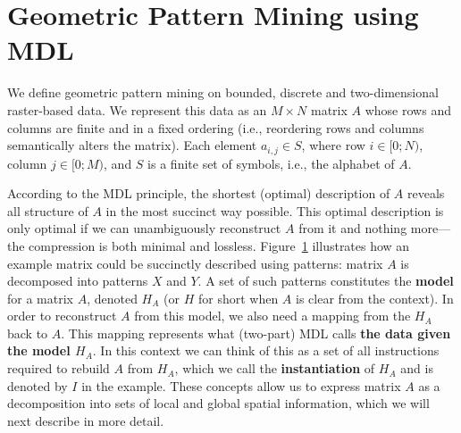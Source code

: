 \documentclass{llncs}
\begin{document}
\section{Geometric Pattern Mining using MDL}



We define geometric pattern mining on bounded, discrete and two-dimensional raster-based data. We represent this data as an $M\times N$ matrix $A$ whose rows and columns are finite and in a fixed ordering (i.e., reordering rows and columns semantically alters the matrix). Each element $a_{i,j} \in S$, where row $i \in [0;N)$, column $j \in [0;M)$, and $S$ is a finite set of symbols, i.e., the alphabet of $A$. %

\begin{figure}[b]

\label{example1}
\end{figure}

According to the MDL principle, the shortest (optimal) description of $A$ reveals all structure of $A$ in the most succinct way possible. This optimal description is only optimal if we can unambiguously reconstruct $A$ from it and nothing more---the compression is both minimal and lossless. Figure~\ref{example1} illustrates how an example matrix could be succinctly described using patterns: matrix $A$ is decomposed into patterns $X$ and $Y$. A set of such patterns constitutes the \textbf{model} for a matrix $A$, denoted $H_A$ (or $H$ for short when $A$ is clear from the context). In order to reconstruct $A$ from this model, we also need a mapping from the $H_A$ back to $A$. This mapping represents what (two-part) MDL calls \textbf{the data given the model $H_A$}. In this context we can think of this as a set of all instructions required to rebuild $A$ from $H_A$, which we call the \textbf{instantiation} of $H_A$ and is denoted by ${I}$ in the example. These concepts allow us to express matrix $A$ as a decomposition into sets of local and global spatial information, which we will next describe in more detail.
\end{document}
